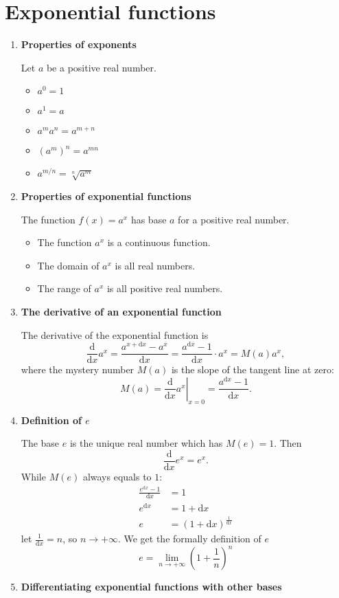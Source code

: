 \section{Exponential functions}
\begin{enumerate}
    \item \textbf{Properties of exponents}

        Let $a$ be a positive real number.
        \begin{itemize}
            \item $a^0=1$
            \item $a^1=a$
            \item $a^m a^n=a^{m+n}$
            \item $(a^m)^n=a^{mn}$
            \item $a^{m/n}=\sqrt[n]{a^m}$
        \end{itemize}
    \item \textbf{Properties of exponential functions}

        The function $f(x)=a^x$ has base $a$ for a positive real number.
        \begin{itemize}
            \item The function $a^x$ is a continuous function.
            \item The domain of $a^x$ is all real numbers.
            \item The range of $a^x$ is all positive real numbers.
        \end{itemize}
    \item \textbf{The derivative of an exponential function}

        The derivative of the exponential function is
        $$
        \frac{\mathrm{d}}{\mathrm{d}x}a^x=\frac{a^{x+\mathrm{d}x}-a^x}{\mathrm{d}x}=\frac{a^{\mathrm{d}x}-1}{\mathrm{d}x}\cdot a^x=M(a)a^x,
        $$
        where the mystery number $M(a)$ is the slope of the tangent line at zero:
        $$
        M(a)=\left.\frac{\mathrm{d}}{\mathrm{d}x}a^x\right|_{x=0}=\frac{a^{\mathrm{d}x}-1}{\mathrm{d}x}.
        $$
    \item \textbf{Definition of $e$}
        
        The base $e$ is the unique real number which has $M(e)=1$. Then
        $$
        \frac{\mathrm{d}}{\mathrm{d}x}e^x=e^x.
        $$
        While $M(e)$ always equals to $1$:
        \begin{align*}
            \frac{e^{\mathrm{d}x} -1}{\mathrm{d}x} & =1 \\
            e^{\mathrm{d}x} & =1+\mathrm{d}x \\
            e & =(1+\mathrm{d}x)^{\frac{1}{\mathrm{d}x}}
        \end{align*}
        let $\frac{1}{\mathrm{d}x}=n$, so $n\to +\infty$. We get the formally definition of $e$
        $$
        e=\lim_{n\to +\infty}(1+\frac{1}{n})^n
        $$
    \item \textbf{Differentiating exponential functions with other bases}


\end{enumerate}
